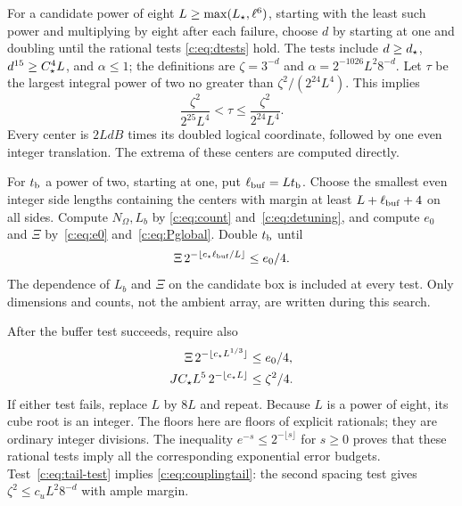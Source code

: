 For a candidate power of eight $L\ge\max(L_\star,\ell^6)$, starting with the
least such power and multiplying by eight after each failure, choose $d$ by
starting at one and doubling until the rational tests
\eqref{c:eq:dtests} hold. The tests include $d\ge d_\star$,
$d^{15}\ge C_\star^4L$, and $\alpha\le1$; the definitions are
$\zeta=3^{-d}$ and $\alpha=2^{-1026}L^2 8^{-d}$.
Let $\tau$ be the largest integral power of two no greater than
$\zeta^2/(2^{24}L^4)$. This implies
\begin{equation}
 \frac{\zeta^2}{2^{25}L^4}<\tau\le
 \frac{\zeta^2}{2^{24}L^4}.                         \label{c:eq:tau-bracket}
\end{equation}
Every center is $2LdB$ times its doubled logical coordinate, followed
by one even integer translation. The extrema of these centers are
computed directly.

For $t_{\rm b}$ a power of two, starting at one, put $\ell_{\rm buf}=Lt_{\rm b}$. Choose the smallest
even integer side lengths containing the centers with margin at least
$L+\ell_{\rm buf}+4$ on all sides. Compute $N_\Omega,L_b$ by
\eqref{c:eq:count} and~\eqref{c:eq:detuning}, and compute $e_0$ and
$\Xi$ by~\eqref{c:eq:e0} and~\eqref{c:eq:Pglobal}. Double $t_{\rm b}$ until
\begin{equation}
 \Xi\,2^{-\lfloor c_\star \ell_{\rm buf}/L\rfloor}\le e_0/4.
                                                               \label{c:eq:buffer-test}
\end{equation}
The dependence of $L_b$ and $\Xi$ on the candidate box is
included at every test. Only dimensions and counts, not the ambient
array, are written during this search.

After the buffer test succeeds, require also
\begin{align}
 \Xi\,2^{-\lfloor c_\star L^{1/3}\rfloor}&\le e_0/4,
                                                               \label{c:eq:leak-test}\\
 JC_\star L^5\,2^{-\lfloor c_\star L\rfloor}&\le\zeta^2/4.
                                                               \label{c:eq:tail-test}
\end{align}
If either test fails, replace $L$ by $8L$ and repeat. Because $L$ is a
power of eight, its cube root is an integer. The floors here are floors
of explicit rationals; they are ordinary integer divisions. The
inequality $e^{-s}\le2^{-\lfloor s\rfloor}$ for $s\ge0$ proves that
these rational tests imply all the corresponding exponential error
budgets. Test~\eqref{c:eq:tail-test} implies
\eqref{c:eq:couplingtail}: the second spacing test gives
$\zeta^2\le c_uL^2 8^{-d}$ with ample margin.

